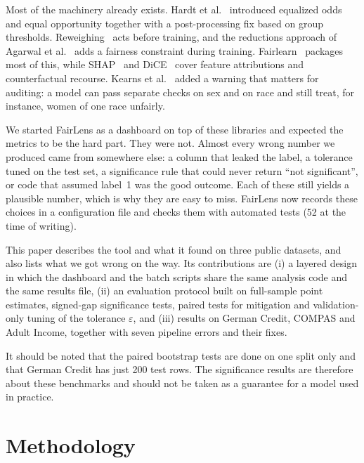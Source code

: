 \documentclass[conference]{IEEEtran}
\newcommand{\eps}{\varepsilon}
\begin{document}
Most of the machinery already exists. Hardt et al.~\cite{hardt2016equality} introduced equalized odds and equal opportunity together with a post-processing fix based on group thresholds. Reweighing~\cite{kamiran2012data} acts before training, and the reductions approach of Agarwal et al.~\cite{agarwal2018reductions} adds a fairness constraint during training. Fairlearn~\cite{bird2020fairlearn} packages most of this, while SHAP~\cite{lundberg2017unified} and DiCE~\cite{mothilal2020explaining} cover feature attributions and counterfactual recourse. Kearns et al.~\cite{kearns2018preventing} added a warning that matters for auditing: a model can pass separate checks on sex and on race and still treat, for instance, women of one race unfairly.

We started FairLens as a dashboard on top of these libraries and expected the metrics to be the hard part. They were not. Almost every wrong number we produced came from somewhere else: a column that leaked the label, a tolerance tuned on the test set, a significance rule that could never return ``not significant'', or code that assumed label~1 was the good outcome. Each of these still yields a plausible number, which is why they are easy to miss. FairLens now records these choices in a configuration file and checks them with automated tests (52 at the time of writing).

This paper describes the tool and what it found on three public datasets, and also lists what we got wrong on the way. Its contributions are (i) a layered design in which the dashboard and the batch scripts share the same analysis code and the same results file, (ii) an evaluation protocol built on full-sample point estimates, signed-gap significance tests, paired tests for mitigation and validation-only tuning of the tolerance $\eps$, and (iii) results on German Credit, COMPAS and Adult Income, together with seven pipeline errors and their fixes.

It should be noted that the paired bootstrap tests are done on one split only and that German Credit has just 200 test rows. The significance results are therefore about these benchmarks and should not be taken as a guarantee for a model used in practice.

\section{Methodology}\label{sec:method}
\end{document}
